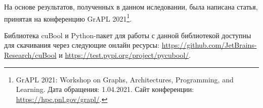 На основе результатов, полученных в данном иследовании, была написана статья, принятая на конференцию GrAPL 2021\footnote{GrAPL 2021: Workshop on Graphs, Architectures, Programming, and Learning. Дата обращения: 1.04.2021. Сайт конференции: \url{https://hpc.pnl.gov/grapl/}.}.

Библиотека cuBool и Python-пакет для работы с данной библиотекой доступны для скачивания через следующие онлайн ресурсы: \url{https://github.com/JetBrains-Research/cuBool} и \url{https://test.pypi.org/project/pycubool/}.